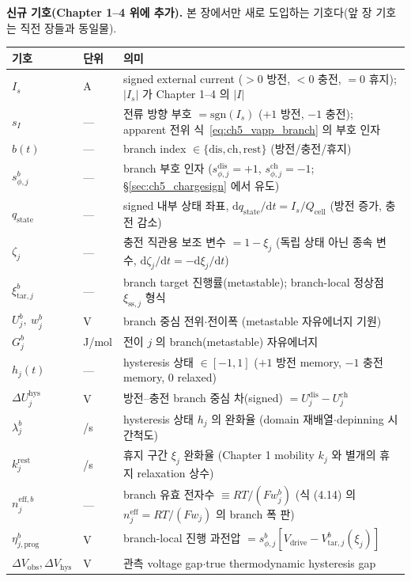 \documentclass[11pt,a4paper]{article}
\newcommand{\dd}{\mathrm{d}}
\newcommand{\eff}{\mathrm{eff}}
\newcommand{\drive}{\mathrm{drive}}
\newcommand{\cell}{\mathrm{cell}}
\newcommand{\sstat}{\mathrm{ss}}
\newcommand{\dis}{\mathrm{dis}}
\newcommand{\chg}{\mathrm{ch}}
\newcommand{\rst}{\mathrm{rest}}
\newcommand{\hys}{\mathrm{hys}}
\newcommand{\obs}{\mathrm{obs}}
\newcommand{\tar}{\mathrm{tar}}
\newcommand{\stt}{\mathrm{state}}
\newcommand{\prog}{\mathrm{prog}}
\begin{document}
\textbf{신규 기호(Chapter 1--4 위에 추가).} 본 장에서만 새로 도입하는 기호다(앞 장 기호는 직전 장들과 동일물).
\begin{longtable}{>{\raggedright\arraybackslash}p{} >{\raggedright\arraybackslash}p{} >{\raggedright\arraybackslash}p{}}
\toprule 기호 & 단위 & 의미 \\ \midrule \endhead
$I_s$ & A & signed external current ($>0$ 방전, $<0$ 충전, $=0$ 휴지); $|I_s|$ 가 Chapter 1--4 의 $|I|$ \\
$s_I$ & --- & 전류 방향 부호 $=\mathrm{sgn}(I_s)$ ($+1$ 방전, $-1$ 충전); apparent 전위 식~\eqref{eq:ch5_vapp_branch} 의 부호 인자 \\
$b(t)$ & --- & branch index $\in\{\dis,\chg,\rst\}$ (방전/충전/휴지) \\
$s_{\phi,j}^b$ & --- & branch 부호 인자 ($s_{\phi,j}^\dis=+1$, $s_{\phi,j}^\chg=-1$; \S\ref{sec:ch5_chargesign} 에서 유도) \\
$q_\stt$ & --- & signed 내부 상태 좌표, $\dd q_\stt/\dd t=I_s/Q_\cell$ (방전 증가, 충전 감소) \\
$\zeta_j$ & --- & 충전 직관용 보조 변수 $=1-\xi_j$ (독립 상태 아닌 종속 변수, $\dd\zeta_j/\dd t=-\dd\xi_j/\dd t$) \\
$\xi_{\tar,j}^b$ & --- & branch target 진행률(metastable); branch-local 정상점 $\xi_{\sstat,j}$ 형식 \\
$U_j^b,\ w_j^b$ & V & branch 중심 전위$\cdot$전이폭 (metastable 자유에너지 기원) \\
$G_j^b$ & J/mol & 전이 $j$ 의 branch(metastable) 자유에너지 \\
$h_j(t)$ & --- & hysteresis 상태 $\in[-1,1]$ ($+1$ 방전 memory, $-1$ 충전 memory, $0$ relaxed) \\
$\Delta U_j^\hys$ & V & 방전--충전 branch 중심 차(signed) $=U_j^\dis-U_j^\chg$ \\
$\lambda_j^b$ & 1/s & hysteresis 상태 $h_j$ 의 완화율 (domain 재배열$\cdot$depinning 시간척도) \\
$k_j^\rst$ & 1/s & 휴지 구간 $\xi_j$ 완화율 (Chapter 1 mobility $k_j$ 와 별개의 휴지 relaxation 상수) \\
$n_j^{\eff,b}$ & --- & branch 유효 전자수 $\equiv RT/(Fw_j^b)$ (식 (4.14) 의 $n_j^\eff=RT/(Fw_j)$ 의 branch 폭 판) \\
$\eta_{j,\prog}^b$ & V & branch-local 진행 과전압 $=s_{\phi,j}^b[V_\drive-V_{\tar,j}^b(\xi_j)]$ \\
$\Delta V_\obs,\Delta V_\hys$ & V & 관측 voltage gap$\cdot$true thermodynamic hysteresis gap \\

\end{longtable}
\end{document}
